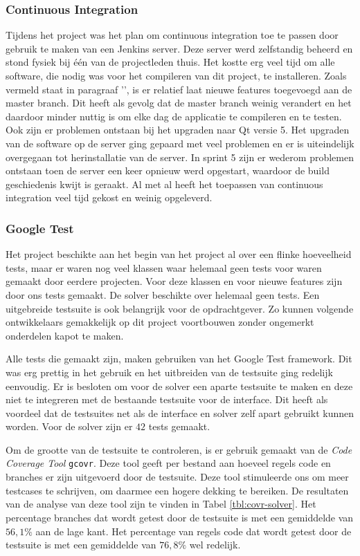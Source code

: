 \subsubsection{Continuous Integration}
Tijdens het project was het plan om continuous integration toe te passen door gebruik te maken van een Jenkins server. Deze server werd zelfstandig beheerd en stond fysiek bij \'e\'en van de projectleden thuis. Het kostte erg veel tijd om alle software, die nodig was voor het compileren van dit project, te installeren. Zoals vermeld staat in paragraaf '', is er relatief laat nieuwe features toegevoegd aan de master branch. Dit heeft als gevolg dat de master branch weinig verandert en het daardoor minder nuttig is om elke dag de applicatie te compileren en te testen. Ook zijn er problemen ontstaan bij het upgraden naar Qt versie 5. Het upgraden van de software op de server ging gepaard met veel problemen en er is uiteindelijk overgegaan tot herinstallatie van de server. In sprint 5 zijn er wederom problemen ontstaan toen de server een keer opnieuw werd opgestart, waardoor de build geschiedenis kwijt is geraakt. Al met al heeft het toepassen van continuous integration veel tijd gekost en weinig opgeleverd. 

\subsubsection{Google Test}
Het project beschikte aan het begin van het project al over een flinke hoeveelheid tests, maar er waren nog veel klassen waar helemaal geen tests voor waren gemaakt door eerdere projecten. Voor deze klassen en voor nieuwe features zijn door ons tests gemaakt. De solver beschikte over helemaal geen tests. Een uitgebreide testsuite is ook belangrijk voor de opdrachtgever. Zo kunnen volgende ontwikkelaars gemakkelijk op dit project voortbouwen zonder ongemerkt onderdelen kapot te maken. 

Alle tests die gemaakt zijn, maken gebruiken van het Google Test framework. Dit was erg prettig in het gebruik en het uitbreiden van de testsuite ging redelijk eenvoudig. Er is besloten om voor de solver een aparte testsuite te maken en deze niet te integreren met de bestaande testsuite voor de interface. Dit heeft als voordeel dat de testsuites net als de interface en solver zelf apart gebruikt kunnen worden. Voor de solver zijn er $42$ tests gemaakt. 

Om de grootte van de testsuite te controleren, is er gebruik gemaakt van de \emph{Code Coverage Tool} \texttt{gcovr}. Deze tool geeft per bestand aan hoeveel regels code en branches er zijn uitgevoerd door de testsuite. Deze tool stimuleerde ons om meer testcases te schrijven, om daarmee een hogere dekking te bereiken. De resultaten van de analyse van deze tool zijn te vinden in Tabel \ref{tbl:covr-solver}. Het percentage branches dat wordt getest door de testsuite is met een gemiddelde van $56,1\%$ aan de lage kant. Het percentage van regels code dat wordt getest door de testsuite is met een gemiddelde van $76,8\%$ wel redelijk.

